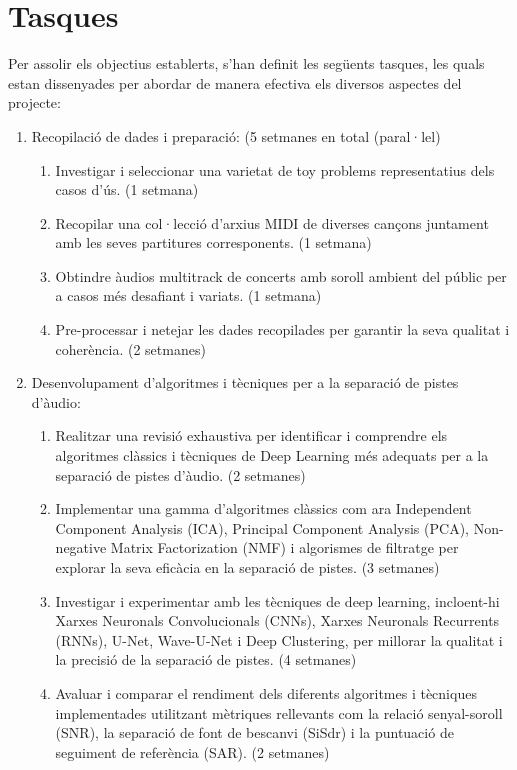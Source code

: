 \documentclass[10pt,a4paper,twocolumn,twoside]{article}
\begin{document}
\section{Tasques}
\label{sec:tasques}

Per assolir els objectius establerts, s'han definit les següents tasques, les quals estan dissenyades per abordar de manera efectiva els diversos aspectes del projecte:

\begin{enumerate}
    \item Recopilació de dades i preparació: (5 setmanes en total (paral·lel)
    \begin{enumerate}
        \item Investigar i seleccionar una varietat de toy problems representatius dels casos d'ús. (1 setmana)
        \item Recopilar una col·lecció d'arxius MIDI de diverses cançons juntament amb les seves partitures corresponents. (1 setmana)
        \item Obtindre àudios multitrack de concerts amb soroll ambient del públic per a casos més desafiant i variats. (1 setmana)
        \item Pre-processar i netejar les dades recopilades per garantir la seva qualitat i coherència. (2 setmanes)
    \end{enumerate}
    
    \item Desenvolupament d'algoritmes i tècniques per a la separació de pistes d'àudio:
    \begin{enumerate}
        \item Realitzar una revisió exhaustiva per identificar i comprendre els algoritmes clàssics i tècniques de Deep Learning més adequats per a la separació de pistes d'àudio. (2 setmanes)
        \item Implementar una gamma d'algoritmes clàssics com ara Independent Component Analysis (ICA), Principal Component Analysis (PCA), Non-negative Matrix Factorization (NMF) i algorismes de filtratge per explorar la seva eficàcia en la separació de pistes. (3 setmanes)
        \item Investigar i experimentar amb les tècniques de deep learning, incloent-hi Xarxes Neuronals Convolucionals (CNNs), Xarxes Neuronals Recurrents (RNNs), U-Net, Wave-U-Net i Deep Clustering, per millorar la qualitat i la precisió de la separació de pistes. (4 setmanes)
        \item Avaluar i comparar el rendiment dels diferents algoritmes i tècniques implementades utilitzant mètriques rellevants com la relació senyal-soroll (SNR), la separació de font de bescanvi (SiSdr) i la puntuació de seguiment de referència (SAR). (2 setmanes)
    \end{enumerate}
    

\end{enumerate}
\end{document}

